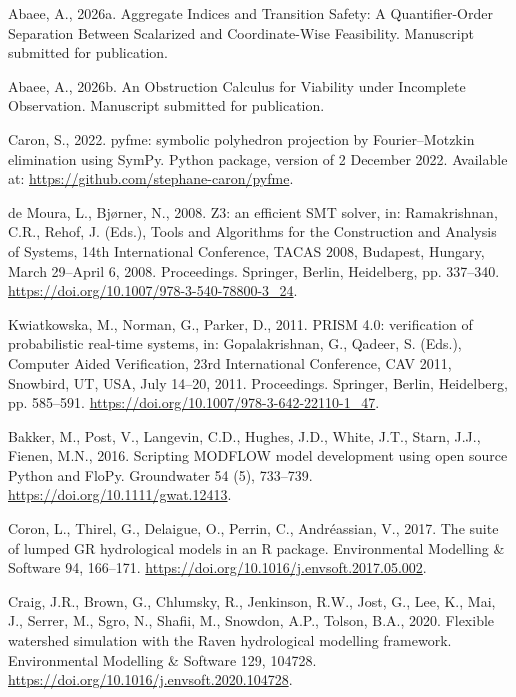 \documentclass[3p,11pt]{elsarticle}
\begin{document}

\begin{thebibliography}{}
\providecommand{\natexlab}[1]{#1}

Abaee, A., 2026a. Aggregate Indices and Transition Safety: A Quantifier-Order
Separation Between Scalarized and Coordinate-Wise Feasibility. Manuscript
submitted for publication.

Abaee, A., 2026b. An Obstruction Calculus for Viability under Incomplete
Observation. Manuscript submitted for publication.


Caron, S., 2022. pyfme: symbolic polyhedron projection by Fourier--Motzkin
elimination using SymPy. Python package, version of 2 December 2022.
Available at: \url{https://github.com/stephane-caron/pyfme}.

de Moura, L., Bj{\o}rner, N., 2008. Z3: an efficient SMT solver, in:
Ramakrishnan, C.R., Rehof, J. (Eds.), Tools and Algorithms for the
Construction and Analysis of Systems, 14th International Conference, TACAS
2008, Budapest, Hungary, March 29--April 6, 2008. Proceedings. Springer,
Berlin, Heidelberg, pp. 337--340.
\url{https://doi.org/10.1007/978-3-540-78800-3\_24}.

Kwiatkowska, M., Norman, G., Parker, D., 2011. PRISM 4.0: verification of
probabilistic real-time systems, in: Gopalakrishnan, G., Qadeer, S. (Eds.),
Computer Aided Verification, 23rd International Conference, CAV 2011,
Snowbird, UT, USA, July 14--20, 2011. Proceedings. Springer, Berlin,
Heidelberg, pp. 585--591. \url{https://doi.org/10.1007/978-3-642-22110-1\_47}.

Bakker, M., Post, V., Langevin, C.D., Hughes, J.D., White, J.T., Starn,
J.J., Fienen, M.N., 2016. Scripting MODFLOW model development using open
source Python and FloPy. Groundwater 54 (5), 733--739.
\url{https://doi.org/10.1111/gwat.12413}.

Coron, L., Thirel, G., Delaigue, O., Perrin, C., Andr\'eassian, V., 2017.
The suite of lumped GR hydrological models in an R package. Environmental
Modelling \& Software 94, 166--171.
\url{https://doi.org/10.1016/j.envsoft.2017.05.002}.

Craig, J.R., Brown, G., Chlumsky, R., Jenkinson, R.W., Jost, G., Lee, K.,
 Mai, J., Serrer, M., Sgro, N., Shafii, M., Snowdon, A.P., Tolson, B.A.,
 2020. Flexible watershed simulation with the Raven hydrological modelling
 framework. Environmental Modelling \& Software 129, 104728.
 \url{https://doi.org/10.1016/j.envsoft.2020.104728}.


\end{thebibliography}
\end{document}
